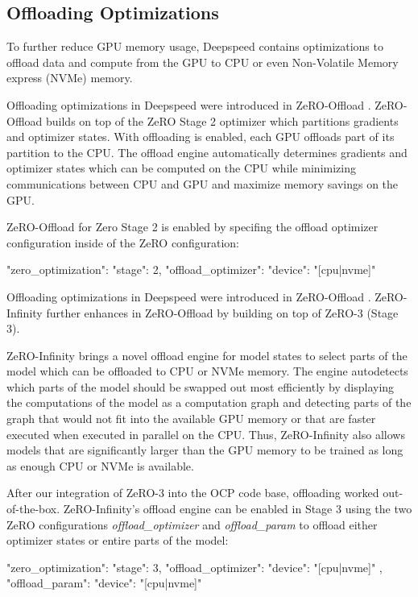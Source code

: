 \subsection{Offloading Optimizations}

To further reduce GPU memory usage, Deepspeed contains optimizations to offload 
data and compute from the GPU to CPU or even Non-Volatile Memory express (NVMe) 
memory. 

Offloading optimizations in Deepspeed were introduced in ZeRO-Offload 
\cite*{DBLP:journals/corr/abs-2101-06840}. ZeRO-Offload builds on top of 
the ZeRO Stage 2 optimizer which partitions gradients and optimizer states. 
With offloading is enabled, each GPU offloads part of its partition to the CPU. 
The offload engine automatically determines gradients and optimizer states 
which can be computed on the CPU while minimizing communications between CPU 
and GPU and maximize memory savings on the GPU.

ZeRO-Offload for Zero Stage 2 is enabled by specifing the offload optimizer 
configuration inside of the ZeRO configuration:

\begin{json}
{
    "zero_optimization": {
        "stage": 2,
        "offload_optimizer": {
            "device": "[cpu|nvme]"
        }
    }
}
\end{json}

Offloading optimizations in Deepspeed were introduced in ZeRO-Offload 
\cite*{DBLP:journals/corr/abs-2101-06840}. ZeRO-Infinity 
\cite*{DBLP:journals/corr/abs-2104-07857}
further enhances in ZeRO-Offload by building on top of ZeRO-3 (Stage 3).

ZeRO-Infinity brings a novel offload engine for model states to select 
parts of the model which can be offloaded to CPU or NVMe memory. 
The engine autodetects which parts of the model should be swapped out most 
efficiently by displaying the computations of the model as a computation 
graph and detecting parts of the graph that would not fit into the available 
GPU memory or that are faster executed when executed in parallel on the CPU. 
Thus, ZeRO-Infinity also allows models that are significantly larger than 
the GPU memory to be trained as long as enough CPU or NVMe is available. 

After our integration of ZeRO-3 into the OCP code base, offloading worked 
out-of-the-box. ZeRO-Infinity's offload engine can be enabled in Stage 3 
using the two ZeRO configurations \textit{offload\_optimizer} and 
\textit{offload\_param} to offload either optimizer states or entire 
parts of the model:

\begin{json}
{
    "zero_optimization": {
        "stage": 3,
        "offload_optimizer": {
            "device": "[cpu|nvme]"
        },
        "offload_param": {
            "device": "[cpu|nvme]"
        }
    }
}
\end{json}